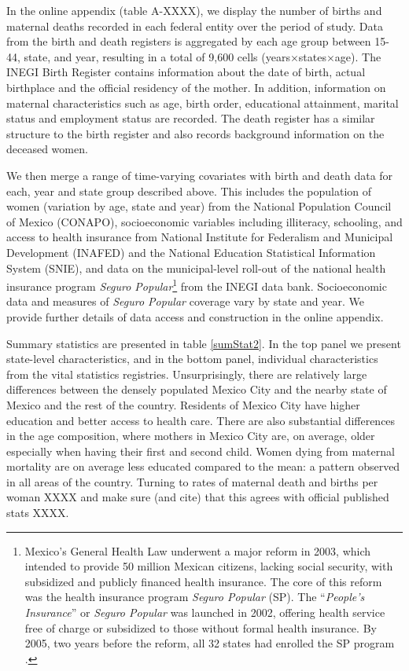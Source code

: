 \documentclass[a4paper, 11pt]{article}
\begin{document}
\begin{spacing}{2}
In the online appendix (table A-XXXX), we display the number of births and maternal deaths recorded in each federal entity over the period of study. Data from the birth and death registers is aggregated by each age group between 15-44, state, and year, resulting in a total of 9,600 cells (years$\times$states$\times$age). The INEGI Birth Register contains information about the date of birth, actual birthplace and the official residency of the mother. In addition, information on maternal characteristics such as age, birth order, educational attainment, marital status and employment status are recorded. The death register has a similar structure to the birth register and also records background information on the deceased women.

We then merge a range of time-varying covariates with birth and death data for each, year and state group described above.  This includes the population of women (variation by age, state and year) from the National Population Council of Mexico (CONAPO), socioeconomic variables including illiteracy, schooling, and access to health insurance from National Institute for Federalism and Municipal Development (INAFED) and the National Education Statistical Information System (SNIE), and data on the municipal-level roll-out of the national health insurance program \emph{Seguro Popular}\footnote{Mexico's General Health Law underwent a major reform in 2003, which intended to provide 50 million Mexican citizens, lacking social security, with subsidized and publicly financed health insurance. The core of this reform was the health insurance program \textit{Seguro Popular} (SP). The ``\textit{People’s Insurance}'' or \textit{Seguro Popular} was launched in 2002, offering health service free of charge or subsidized to those without formal health insurance. By 2005, two years before the reform, all 32 states had enrolled the SP program \citep{knaul__2007}.} from the INEGI data bank.  Socioeconomic data and measures of \emph{Seguro Popular} coverage vary by state and year.  We provide further details of data access and construction in the online appendix.

Summary statistics are presented in table \ref{sumStat2}.  In the top panel we present state-level characteristics, and in the bottom panel, individual characteristics from the vital statistics registries.  Unsurprisingly, there are relatively large differences between the densely populated Mexico City and the nearby state of Mexico and the rest of the country.  Residents of Mexico City have higher education and better access to health care. There are also substantial differences in the age composition, where mothers in Mexico City are, on average, older especially when having their first and second child.  Women dying from maternal mortality are on average less educated compared to the mean: a pattern observed in all areas of the country.  Turning to rates of maternal death and births per woman XXXX and make sure (and cite) that this agrees with official published stats XXXX.


\end{spacing}
\end{document}
